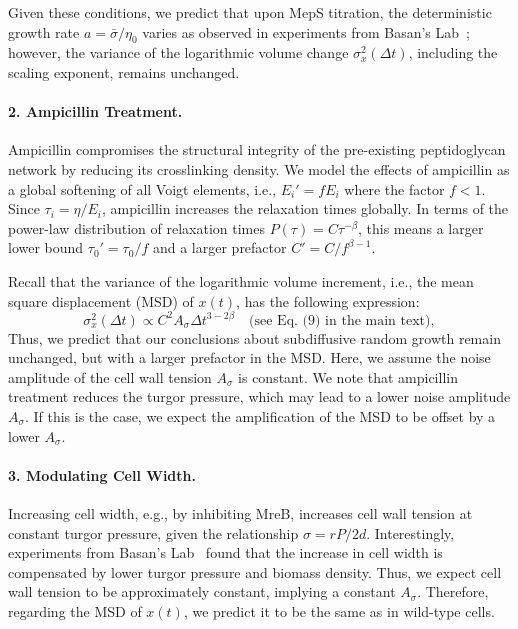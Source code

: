 \documentclass[aps, prl, longbibliography, linenumbers, superscriptaddress]{revtex4-2}
\begin{document}
Given these conditions, we predict that upon MepS titration, the deterministic growth rate $a = \bar{\sigma} / \eta_0$ varies as observed in experiments from Basan's Lab~\cite{Mukherjee2025bacterial}; however, the variance of the logarithmic volume change $\sigma_x^2(\Delta t)$, including the scaling exponent, remains unchanged.

\paragraph{2. Ampicillin Treatment.}
Ampicillin compromises the structural integrity of the pre-existing peptidoglycan network by reducing its crosslinking density. We model the effects of ampicillin as a global softening of all Voigt elements, i.e., $E_i' = f E_i$ where the factor $f < 1$. Since $\tau_i = \eta / E_i$, ampicillin increases the relaxation times globally. In terms of the power-law distribution of relaxation times $P(\tau) = C \tau^{-\beta}$, this means a larger lower bound $\tau_0' = \tau_0 / f$ and a larger prefactor $C' = C / f^{\beta - 1}$.

Recall that the variance of the logarithmic volume increment, i.e., the mean square displacement (MSD) of $x(t)$, has the following expression:
\begin{equation}
    \sigma_x^2(\Delta t) \propto C^2 A_\sigma \Delta t^{3 - 2\beta} \quad \text{(see Eq.~(9) in the main text)},
\end{equation}
Thus, we predict that our conclusions about subdiffusive random growth remain unchanged, but with a larger prefactor in the MSD. Here, we assume the noise amplitude of the cell wall tension $A_\sigma$ is constant. We note that ampicillin treatment reduces the turgor pressure, which may lead to a lower noise amplitude $A_\sigma$. If this is the case, we expect the amplification of the MSD to be offset by a lower $A_\sigma$.

\paragraph{3. Modulating Cell Width.}
Increasing cell width, e.g., by inhibiting MreB, increases cell wall tension at constant turgor pressure, given the relationship $\sigma = r P / 2d$. Interestingly, experiments from Basan's Lab~\cite{Mukherjee2025bacterial} found that the increase in cell width is compensated by lower turgor pressure and biomass density. Thus, we expect cell wall tension to be approximately constant, implying a constant $A_\sigma$. Therefore, regarding the MSD of $x(t)$, we predict it to be the same as in wild-type cells.
\end{document}
